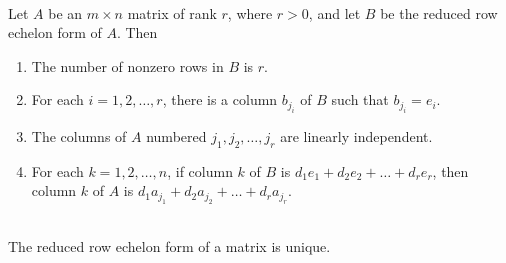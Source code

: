 \begin{theorem}
	\hfill\\
	Let $A$ be an $m \times n$ matrix of rank $r$, where $r > 0$, and let $B$ be the reduced row echelon form of $A$. Then
	
	\begin{enumerate}
		\item The number of nonzero rows in $B$ is $r$.
		\item For each $i = 1, 2, \dots, r$, there is a column $b_{j_i}$ of $B$ such that $b_{j_i} = e_i$.
		\item The columns of $A$ numbered $j_1, j_2, \dots, j_r$ are linearly independent.
		\item For each $k = 1, 2, \dots, n$, if column $k$ of $B$ is $d_1e_1+d_2e_2+\dots+d_re_r$, then column $k$ of $A$ is $d_1a_{j_1} + d_2a_{j_2} + \dots + d_ra_{j_r}$.
	\end{enumerate}
\end{theorem}

\begin{corollary}
	\hfill\\
	The reduced row echelon form of a matrix is unique.
\end{corollary}